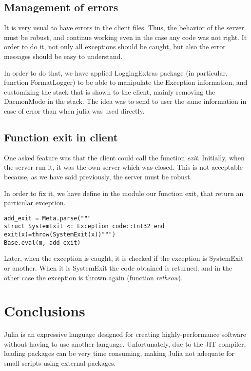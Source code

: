 \documentclass{juliacon}
\begin{document}
\subsection{Management of errors}

It is very usual to have errors in the client files. Thus, the behavior of the
server must be robust, and continue working even in the case any code was not
right. It order to do it, not only all exceptions should be caught, but also 
the error messages should be easy to understand.

In order to do that, we have applied LoggingExtras package (in particular,
function FormatLogger) to be able to manipulate the Exception information, and
customizing the stack that is shown to the client, mainly removing the
DaemonMode in the stack. The idea was to send to user the same information in
case of error than when julia was used directly.


\subsection{Function exit in client}

One asked feature was that the client could call the function \textit{exit}.
Initially, when the server run it, it was the own server which was closed. This
is not acceptable because, as we have said previously, the server  must be
robust.

In order to fix it, we  have define in the module our function exit, that return
an particular exception. 

\begin{lstlisting}
add_exit = Meta.parse("""
struct SystemExit <: Exception code::Int32 end 
exit(x)=throw(SystemExit(x))""")
Base.eval(m, add_exit)
\end{lstlisting}

Later, when the exception is caught, it is checked if the exception is
SystemExit or another. When it is SystemExit the code obtained is returned, and in
the other case the exception is thrown again (function \textit{rethrow}).

\section{Conclusions}
\label{sec:conclusions}

Julia is an expressive language designed for creating highly-performance
software without having to use another language. Unfortunately, due to the JIT
compiler, loading packages can be very time consuming, making Julia not adequate
for small scripts using external packages.
\end{document}

